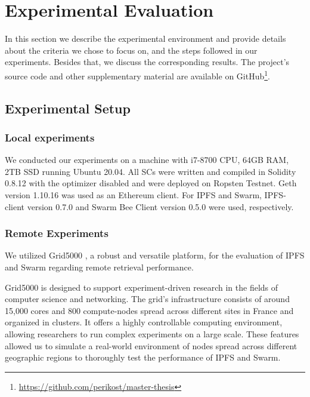 \chapter{Experimental Evaluation}\label{chapter:experiments}
In this section we describe the experimental environment and provide details about the criteria we chose to focus on, and the steps followed in our experiments. Besides that, we discuss the corresponding results. The project's source code and other supplementary material are available on GitHub\footnote{\url{https://github.com/perikost/master-thesis}}.

\section{Experimental Setup}\label{sec:}
\subsection{Local experiments}\label{sec:}
We conducted our experiments on a machine with i7-8700 CPU, 64GB RAM, 2TB SSD running Ubuntu 20.04. All SCs were written and compiled in Solidity 0.8.12 with the optimizer disabled and were deployed on Ropsten Testnet. Geth version 1.10.16 was used as an Ethereum client. For IPFS and Swarm, IPFS-client version 0.7.0 and Swarm Bee Client version 0.5.0 were used, respectively.
\subsection{Remote Experiments}\label{sec:setup_remote}
We utilized Grid5000 \citep{bolze_2006}, a robust and versatile platform, for the evaluation of IPFS and Swarm regarding remote retrieval performance. 

Grid5000 is designed to support experiment-driven research in the fields of computer science and networking.
 The grid's infrastructure consists of around 15,000 cores and 800 compute-nodes spread across different sites in France and organized in clusters. It offers a highly controllable computing environment, allowing researchers to run complex experiments on a large scale. These features allowed us to simulate a real-world environment of nodes spread across different geographic regions to thoroughly test the performance of IPFS and Swarm.

